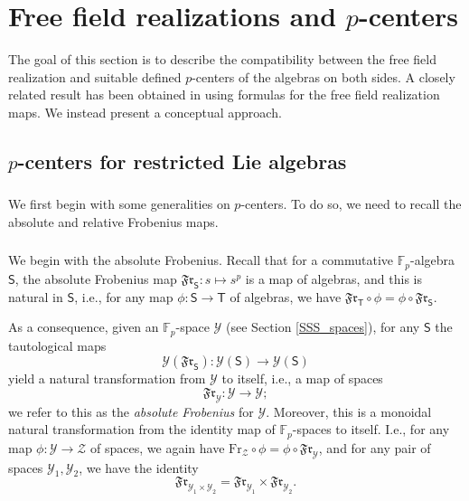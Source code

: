 \documentclass{amsart}
\theoremstyle{definition}
\newcommand{\sY}{\mathscr{Y}}
\newcommand{\sss}{\subsubsection{}}
\newcommand{\Sing}{\mathsf{S}}
\newcommand{\Ting}{\mathsf{T}}
\newcommand{\on}{\mathrm}
\newcommand{\F}{\mathbb{F}}
\numberwithin{equation}{section}
\begin{document}
\section{Free field realizations and $p$-centers}\label{S_ffr_p_cent}

The goal of this section is to describe the compatibility between the free field realization and suitable defined $p$-centers of the algebras on both sides. A closely related result has been obtained in \cite{AW} using formulas for the free field realization maps. We instead present a conceptual approach. 

\subsection{$p$-centers for restricted Lie algebras}

\sss We first begin with some generalities on $p$-centers. To do so, we need to recall the absolute and relative Frobenius maps. 

\sss We begin with the absolute Frobenius. Recall that for a commutative $\F_p$-algebra $\Sing$, the absolute Frobenius map $\mathfrak{Fr}_\Sing: s \mapsto s^p$ is a map of algebras, and this is natural in $\Sing$, i.e., for any map $\phi: \Sing \rightarrow \Ting$ of algebras, we have $\mathfrak{Fr}_\Ting \circ \phi = \phi \circ \mathfrak{Fr}_\Sing$.

As a consequence, given an $\F_p$-space $\sY$ (see Section \ref{SSS_spaces}), for any $\Sing$ the tautological maps
$$\sY(\mathfrak{Fr}_\Sing): \sY(\Sing) \xrightarrow{} \sY(\Sing)$$ yield a natural transformation from $\sY$ to itself, i.e., a map of spaces
$$\mathfrak{Fr}_{\sY}: \sY \rightarrow \sY;$$we refer to this as the {\it absolute Frobenius} for $\sY$. Moreover, this is a monoidal natural transformation from the identity map of $\F_p$-spaces to itself. I.e., for any map $\phi: \sY \rightarrow \mathscr{Z}$ of spaces, we again have $\on{Fr}_{\mathscr{Z}} \circ \phi = \phi \circ \mathfrak{Fr}_{\mathscr{Y}}$, and for any pair of spaces $\sY_1, \sY_2$, we have the identity 
$$\mathfrak{Fr}_{\sY_1 \times \sY_2} = \mathfrak{Fr}_{\sY_1} \times \mathfrak{Fr}_{\sY_2}.$$
\end{document}
